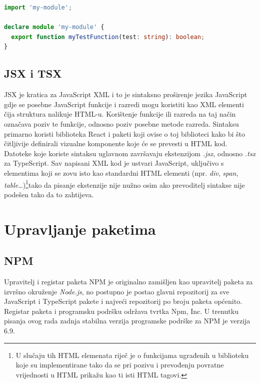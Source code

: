 \documentclass[times, utf8, diplomski, numeric]{fer}
\newcommand{\razmakp}{\vspace{18pt}}
\newcommand{\razmaks}{\vspace{10pt}}
\begin{document}
\razmakp %
\begin{lstlisting}[language=TypeScript, caption={Primjer deklaracijske datoteke}, label={lst:declaration_file}]
import 'my-module';

declare module 'my-module' {
  export function myTestFunction(test: string): boolean;
}
\end{lstlisting}
\razmaks


\subsection{JSX i TSX}

JSX je kratica za JavaScript XML i to je sintaksno proširenje jezika JavaScript gdje se posebne JavaScript funkcije i razredi mogu koristiti kao XML elementi čija struktura nalikuje HTML-u\citep{jsx_spec}.
Korištenje funkcije ili razreda na taj način označava poziv te funkcije, odnosno poziv posebne metode razreda. Sintaksu primarno koristi biblioteka React i paketi koji ovise o toj biblioteci kako bi što čitljivije definirali vizualne komponente koje će se prevesti u HTML kod\citep{react_docs}.
Datoteke koje koriste sintaksu uglavnom završavaju ekstenzijom \emph{.jsx}, odnosno \emph{.tsx} za TypeScript\citep{ts_hand}.
Sav napisani XML kod je ustvari JavaScript, uključivo s elementima koji se zovu isto kao standardni HTML elementi (npr. \emph{div}, \emph{span}, \emph{table}…)\footnote{
    U slučaju tih HTML elemenata riječ je o funkcijama ugrađenih u biblioteku koje su implementirane tako da se pri pozivu i prevođenju povratne vrijednosti u HTML prikažu kao ti isti HTML tagovi.
}tako da pisanje ekstenzije nije nužno osim ako prevoditelj sintakse nije podešen tako da to zahtijeva.


\newpage
\section{Upravljanje paketima}

\razmaks
\subsection{NPM}

Upravitelj i registar paketa NPM je originalno zamišljen kao upravitelj paketa za izvršno okruženje \emph{Node.js}, no postupno je postao glavni repozitorij za sve JavaScript i TypeScript pakete i najveći repozitorij po broju paketa općenito\citep{med_npm_stats}.
Registar paketa i programsku podršku održava tvrtka Npm, Inc.
U trenutku pisanja ovog rada zadnja stabilna verzija programske podrške za NPM je verzija 6.9\citep{wiki_npm}.
\end{document}
